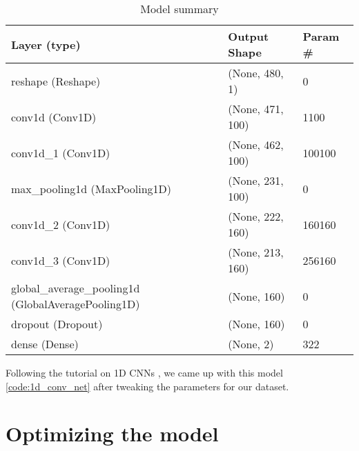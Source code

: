\begin{table}[]
  \begin{tabular}{|l|l|l|}
    \hline
    \multicolumn{1}{|l|}{\textbf{Layer (type)}}         & \multicolumn{1}{l|}{\textbf{Output Shape}} & \multicolumn{1}{l|}{\textbf{Param \#}} \\ \hline
    reshape (Reshape)                                   & (None, 480, 1)                             & 0                                      \\  
    conv1d (Conv1D)                                     & (None, 471, 100)                           & 1100                                   \\ 
    conv1d\_1 (Conv1D)                                  & (None, 462, 100)                           & 100100                                 \\ 
    max\_pooling1d (MaxPooling1D)                       & (None, 231, 100)                           & 0                                      \\ 
    conv1d\_2 (Conv1D)                                  & (None, 222, 160)                           & 160160                                 \\ 
    conv1d\_3 (Conv1D)                                  & (None, 213, 160)                           & 256160                                 \\ 
    global\_average\_pooling1d (GlobalAveragePooling1D) & (None, 160)                                & 0                                      \\ 
    dropout (Dropout)                                   & (None, 160)                                & 0                                      \\ 
    dense (Dense)                                       & (None, 2)                                  & 322                                    \\ 
    \hline
  \end{tabular}
  \caption{Model summary}
  \label{table:model_summary}
\end{table}

Following the tutorial on 1D CNNs \cite{1d_cnn}, we came up with this model \ref{code:1d_conv_net} after tweaking the parameters for our dataset.
 

\section{Optimizing the model}